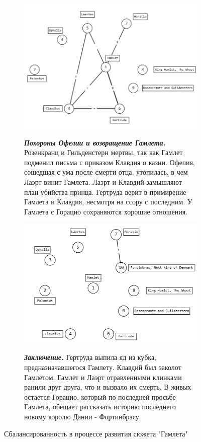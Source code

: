 \documentclass{article}
\begin{document}
\begin{enumerate}
\begin{figure}[ht]
\begin{subfigure}[t]{0.47\textwidth}
         \label{fig:21_2}
     \end{subfigure}
     \hfill
     \begin{subfigure}[t]{0.47\textwidth}
         \centering
         \caption{\small{\textit{\textbf{Похороны Офелии и возвращение Гамлета.}} Розенкранц и Гильденстерн мертвы, так как Гамлет подменил письма с приказом Клавдия о казни. Офелия, сошедшая с ума после смерти отца, утопилась, в чем Лаэрт винит Гамлета. Лаэрт и Клавдий замышляют план убийства принца. Гертруда верит в примирение Гамлета и Клавдия, несмотря на ссору с последним. У Гамлета с Горацио сохраняются хорошие отношения.}}
         \includegraphics[width=\textwidth]
         {attachments/21/hamlet-3.png}
         \label{fig:21_3}
     \end{subfigure}
     \hfill
     \begin{subfigure}[t]{0.47\textwidth}
         \centering
         \caption{\small{\textit{\textbf{Заключение.}} Гертруда выпила яд из кубка, предназначавшегося Гамлету. Клавдий был заколот Гамлетом. Гамлет и Лаэрт отравленными клинками ранили друг друга, что и вызвало их смерть. В живых остается Горацио, который по последней просьбе Гамлета, обещает рассказать историю последнего новому королю Дании - Фортинбрасу.}}
         \includegraphics[width=\textwidth]
         {attachments/21/hamlet-4.png}
         \label{fig:21_4}
     \end{subfigure}
        \caption{Сбалансированность в процессе развития сюжета "Гамлета"}
        \label{fig:21_hamlet}
\end{figure}
\end{enumerate}
\end{document}
